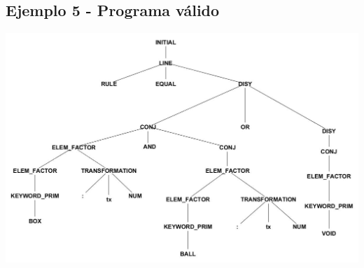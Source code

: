 \subsection{Ejemplo 5 - Programa v\'alido}

\centerline{\includegraphics[scale=0.40]{arboles_derivacion/Ejemplo_and_or1.jpg}}
